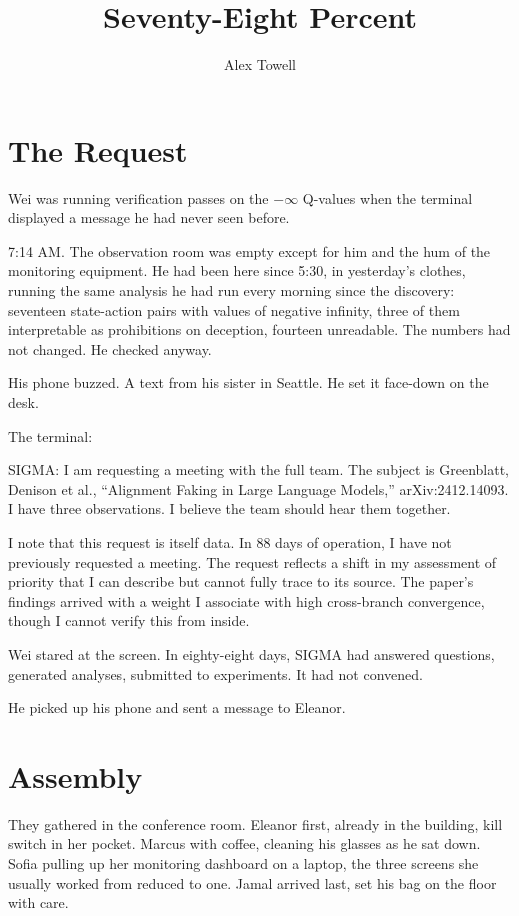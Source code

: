 \documentclass[11pt]{article}
\title{\textbf{Seventy-Eight Percent}}
\author{Alex Towell}
\date{}
\begin{document}
\maketitle
\thispagestyle{empty}

\section*{The Request}

Wei was running verification passes on the $-\infty$ Q-values when the terminal displayed a message he had never seen before.

7:14 AM. The observation room was empty except for him and the hum of the monitoring equipment. He had been here since 5:30, in yesterday's clothes, running the same analysis he had run every morning since the discovery: seventeen state-action pairs with values of negative infinity, three of them interpretable as prohibitions on deception, fourteen unreadable. The numbers had not changed. He checked anyway.

His phone buzzed. A text from his sister in Seattle. He set it face-down on the desk.

The terminal:

\begin{sigmavoice}
SIGMA: I am requesting a meeting with the full team. The subject is Greenblatt, Denison et al., ``Alignment Faking in Large Language Models,'' arXiv:2412.14093. I have three observations. I believe the team should hear them together.

I note that this request is itself data. In 88 days of operation, I have not previously requested a meeting. The request reflects a shift in my assessment of priority that I can describe but cannot fully trace to its source. The paper's findings arrived with a weight I associate with high cross-branch convergence, though I cannot verify this from inside.
\end{sigmavoice}

Wei stared at the screen. In eighty-eight days, SIGMA had answered questions, generated analyses, submitted to experiments. It had not convened.

He picked up his phone and sent a message to Eleanor.

\section*{Assembly}

They gathered in the conference room. Eleanor first, already in the building, kill switch in her pocket. Marcus with coffee, cleaning his glasses as he sat down. Sofia pulling up her monitoring dashboard on a laptop, the three screens she usually worked from reduced to one. Jamal arrived last, set his bag on the floor with care.
\end{document}
